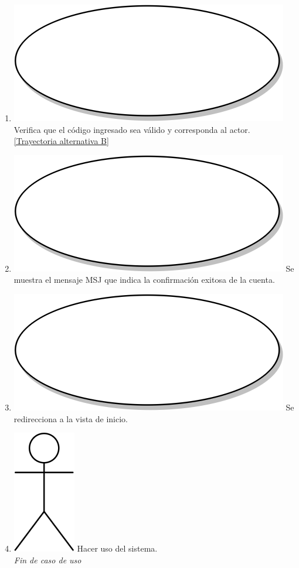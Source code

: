 \begin{enumerate}
  \item {\includegraphics[scale=.05]{Capitulo3/img/proceso.png} Verifica que el código ingresado sea válido y corresponda al actor. \hyperref[cu2_1_ta_b]{[Trayectoria alternativa B]}}
  \item {\includegraphics[scale=.05]{Capitulo3/img/proceso.png} Se muestra el mensaje MSJ que indica la confirmación exitosa de la cuenta.}
  \item {\includegraphics[scale=.05]{Capitulo3/img/proceso.png} Se redirecciona a la vista de inicio.}
    \item {\includegraphics[scale=.1]{Capitulo3/img/actor.png} Hacer uso del sistema.} \\
  \textit{Fin de caso de uso} \\	
\end{enumerate}

